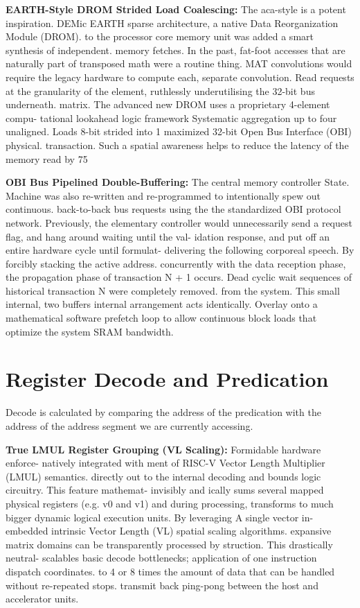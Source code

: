 \textbf{EARTH-Style DROM Strided Load Coalescing:} The aca-style is a potent inspiration. DEMic EARTH sparse architecture, a native Data Reorganization Module (DROM). to the processor core memory unit was added a smart synthesis of independent. memory fetches. In the past, fat-foot accesses that are naturally part of transposed math were a routine thing. MAT convolutions would require the legacy hardware to compute each, separate convolution. Read requests at the granularity of the element, ruthlessly underutilising the 32-bit bus underneath. matrix. The advanced new DROM uses a proprietary 4-element compu- tational lookahead logic framework Systematic aggregation up to four unaligned. Loads 8-bit strided into 1 maximized 32-bit Open Bus Interface (OBI) physical. transaction. Such a spatial awareness helps to reduce the latency of the memory read by 75%

\textbf{OBI Bus Pipelined Double-Buffering:} The central memory controller State. Machine was also re-written and re-programmed to intentionally spew out continuous. back-to-back bus requests using the the standardized OBI protocol network. Previously, the elementary controller would unnecessarily send a request flag, and hang around waiting until the val- idation response, and put off an entire hardware cycle until formulat- delivering the following corporeal speech. By forcibly stacking the active address. concurrently with the data reception phase, the propagation phase of transaction N + 1 occurs. Dead cyclic wait sequences of historical transaction N were completely removed. from the system. This small internal, two buffers internal arrangement acts identically. Overlay onto a mathematical software prefetch loop to allow continuous block loads that optimize the system SRAM bandwidth.

\section{Register Decode and Predication}
Decode is calculated by comparing the address of the predication with the address of the address segment we are currently accessing.

\textbf{True LMUL Register Grouping (VL Scaling):} Formidable hardware enforce- natively integrated with ment of RISC-V Vector Length Multiplier (LMUL) semantics. directly out to the internal decoding and bounds logic circuitry. This feature mathemat- invisibly and ically sums several mapped physical registers (e.g. v0 and v1) and during processing, transforms to much bigger dynamic logical execution units. By leveraging A single vector in- embedded intrinsic Vector Length (VL) spatial scaling algorithms. expansive matrix domains can be transparently processed by struction. This drastically neutral- scalables basic decode bottlenecks; application of one instruction dispatch coordinates. to 4 or 8 times the amount of data that can be handled without re-repeated stops. transmit back ping-pong between the host and accelerator units.

